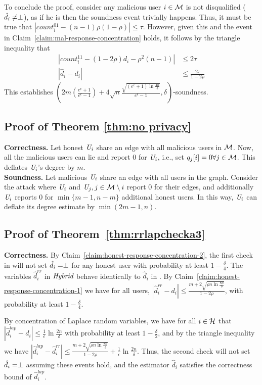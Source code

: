 To conclude the proof, consider any malicious user $i \in \mathcal{M}$ is not disqualified ($\hat{d}_i \neq \perp$),
as if he is then the soundness event trivially happens. Thus, it must be true that $|count_i^{01} - (n-1)\rho(1-\rho)| \leq \tau$. However, given this and the event in Claim~\ref{claim:mal-response-concentration} holds, it follows by the triangle inequality that
\begin{align*}
    |count_i^{11}-(1-2\rho)d_i - \rho^2(n-1)| &\leq 2 \tau \\
    |\hat{d}_i - d_i| &\leq \frac{2 \tau }{1-2\rho}
\end{align*}
This establishes $\left( 2m (\frac{e^\epsilon+1}{e^{\epsilon}-1}) + 4\sqrt{n}\frac{ \sqrt{(e^\epsilon+1)\ln \frac{4n}{\delta}}}{e^\epsilon-1}, \delta\right)$-soundness.

\subsection{Proof of Theorem \ref{thm:no privacy}}\label{app:thm:no privacy}
\textbf{Correctness.}
Let honest $\textit{U}_i$ share an edge with all malicious users in $\mathcal{M}$. Now, all the malicious users can lie and report $0$ for $\textit{U}_i$, i.e., set $q_j[i]=0 \forall j \in \mathcal{M}$. This deflates $\textit{U}_i$'s degree by $m$.
\\
\noindent \textbf{Soundness.} Let malicious $\textit{U}_i$ share an edge with all users in the graph. Consider the attack where $\textit{U}_i$ and $\textit{U}_j, j \in \mathcal{M} \setminus i$ report $0$ for their edges, and additionally $\textit{U}_i$ reports $0$ for $\min\{m-1, n-m\}$ additional honest users. In this way, $\textit{U}_i$ can deflate its degree estimate by $\min(2m-1,n)$.

\subsection{Proof of Theorem~\ref{thm:rrlapchecka3}}
\textbf{Correctness.}\label{app:thm:rrlapchecka3}
By Claim~\ref{claim:honest-response-concentration-2}, the first check in \DegHybrid{} will not set $\hat{d}_i = \perp$ for any honest user with probability at least $1-\frac{\delta}{4}$. 
The variables $\hat{d}_i^{rr}$ in $\textit{Hybrid}$ behave identically to $\hat{d}_i$ in \DegRRCheck{}. By Claim~\ref{claim:honest-response-concentration-1} 
we have for all users, $|\hat{d}_i^{rr} - d_i| \leq \frac{m + 2 \sqrt{\rho n \ln \frac{8n}{\delta}}}{1-2\rho}$,
with probability at least $1-\frac{\delta}{4}$. 

By concentration of Laplace random variables, we have for all $i \in \mathcal{H}$ that $|\hat{d}_i^{lap} - d_i| \leq \frac{1}{\epsilon} \ln \frac{2n}{\delta}$ with probability at least $1-\frac{\delta}{2}$, 
and by the triangle inequality we have $|\hat{d}_i^{lap} - \hat{d}_i^{rr}| \leq \frac{m + 2 \sqrt{\rho n \ln \frac{8n}{\delta}}}{1-2\rho} + \frac{1}{\epsilon}\ln \frac{2n}{\delta}$. Thus, the second check will not set $\hat{d}_i = \perp$ assuming these events hold, and the estimator $\hat{d}_i$ satisfies the correctness bound of $\hat{d}_i^{lap}$.

